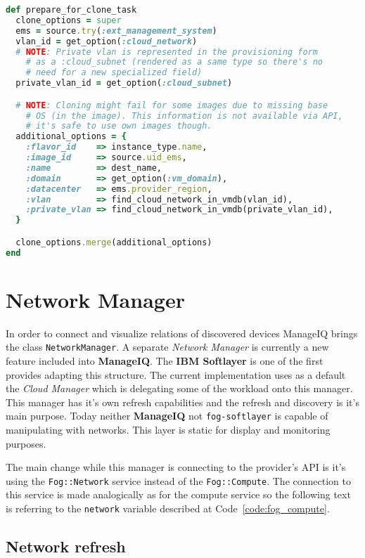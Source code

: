 \begin{lstlisting}[language=Ruby,caption={Prepare cloning options},label=code:cloning,float=htpb]
def prepare_for_clone_task
  clone_options = super
  ems = source.try(:ext_management_system)
  vlan_id = get_option(:cloud_network)
  # NOTE: Private vlan is represented in the provisioning form
	# as a :cloud_subnet (rendered as a same type so there's no
	# need for a new specialized field)
  private_vlan_id = get_option(:cloud_subnet)

  # NOTE: Cloning might fail for some images due to missing base
	# OS (in the image). This information is not available via API,
	# it's safe to use own images though.
  additional_options = {
    :flavor_id    => instance_type.name,
    :image_id     => source.uid_ems,
    :name         => dest_name,
    :domain       => get_option(:vm_domain),
    :datacenter   => ems.provider_region,
    :vlan         => find_cloud_network_in_vmdb(vlan_id),
    :private_vlan => find_cloud_network_in_vmdb(private_vlan_id),
  }

  clone_options.merge(additional_options)
end
\end{lstlisting}

\clearpage
\section{Network Manager}
\label{sec:Network Manager}

In order to connect and visualize relations of discovered devices ManageIQ brings the class \texttt{NetworkManager}. A separate \emph{Network Manager} is currently a new feature included into \textbf{ManageIQ}. The \textbf{IBM Softlayer} is one of the first provides adapting this structure. The current implementation uses as a default the \emph{Cloud Manager} which is delegating some of the workload onto this manager. This manager has it's own refresh capabilities and the refresh and discovery is it's main purpose. Today neither \textbf{ManageIQ} not \texttt{fog-softlayer} is capable of manipulating with networks. This layer is static for display and monitoring purposes.

The main change while this manager is connecting to the provider's API is it's using the \texttt{Fog::Network} service instead of the \texttt{Fog::Compute}. The connection to this service is made analogically as for the compute service so the following text is referring to the \texttt{network} variable described at Code~\ref{code:fog_compute}.

\subsection{Network refresh}
\label{sub:Network refresh}

